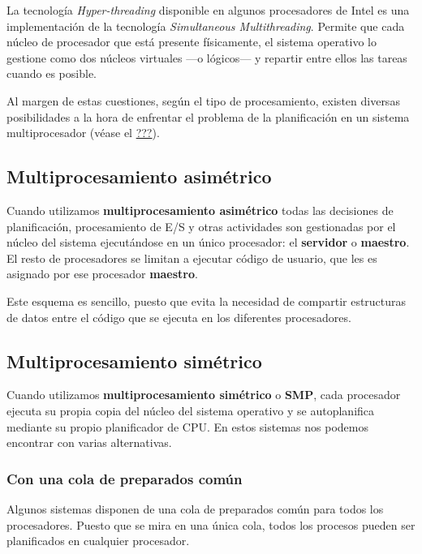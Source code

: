 La tecnología \emph{Hyper-threading} disponible en algunos procesadores
de Intel es una implementación de la tecnología \emph{Simultaneous
Multithreading}. Permite que cada núcleo de procesador que está presente
físicamente, el sistema operativo lo gestione como dos núcleos virtuales
---o lógicos--- y repartir entre ellos las tareas cuando es posible.

Al margen de estas cuestiones, según el tipo de procesamiento, existen
diversas posibilidades a la hora de enfrentar el problema de la
planificación en un sistema multiprocesador (véase el
\hyperref[_sistemas_multiprocesador]{???}).

\subsection{Multiprocesamiento
asimétrico}\label{_multiprocesamiento_asimuxe9trico}

{} {} Cuando utilizamos \textbf{multiprocesamiento asimétrico} todas las
decisiones de planificación, procesamiento de E/S y otras actividades
son gestionadas por el núcleo del sistema ejecutándose en un único
procesador: el \textbf{servidor} o \textbf{maestro}. El resto de
procesadores se limitan a ejecutar código de usuario, que les es
asignado por ese procesador \textbf{maestro}.

Este esquema es sencillo, puesto que evita la necesidad de compartir
estructuras de datos entre el código que se ejecuta en los diferentes
procesadores.

\subsection{Multiprocesamiento
simétrico}\label{_multiprocesamiento_simuxe9trico}

{} {} Cuando utilizamos \textbf{multiprocesamiento simétrico} o
\textbf{SMP}, cada procesador ejecuta su propia copia del núcleo del
sistema operativo y se autoplanifica mediante su propio planificador de
CPU. En estos sistemas nos podemos encontrar con varias alternativas.

\subsubsection{Con una cola de preparados
común}\label{_con_una_cola_de_preparados_comuxfan}

Algunos sistemas disponen de una cola de preparados común para todos los
procesadores. Puesto que se mira en una única cola, todos los procesos
pueden ser planificados en cualquier procesador.

